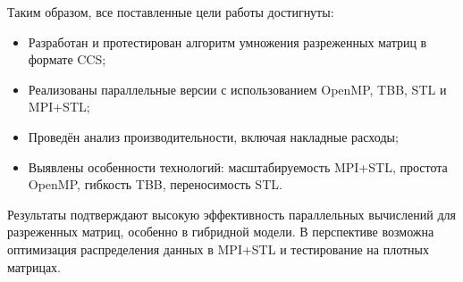 \documentclass[12pt]{extarticle}
\begin{document}
Таким образом, все поставленные цели работы достигнуты: \\[-0.9cm]
\begin{itemize}
  \item Разработан и протестирован алгоритм умножения разреженных матриц в формате CCS; \\[-0.9cm]
  \item Реализованы параллельные версии с использованием OpenMP, TBB, STL и MPI+STL; \\[-0.9cm]
  \item Проведён анализ производительности, включая накладные расходы; \\[-0.9cm]
  \item Выявлены особенности технологий: масштабируемость MPI+STL, простота OpenMP, гибкость TBB, переносимость STL. \\[-0.9cm]
\end{itemize}

Результаты подтверждают высокую эффективность параллельных вычислений для разреженных матриц, особенно в гибридной модели. В перспективе возможна оптимизация распределения данных в MPI+STL и тестирование на плотных матрицах.

\newpage
\end{document}
